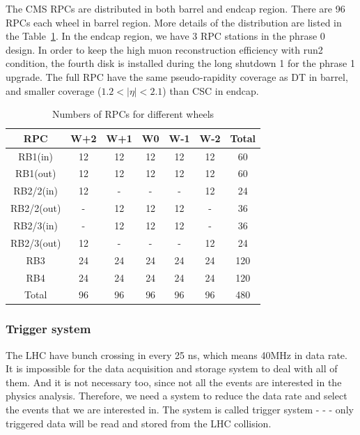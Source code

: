 The CMS RPCs are distributed in both barrel and endcap region. There are 96 RPCs each wheel in barrel region. More details of the distribution are listed in the Table~\ref{tab:c3cmsrpc}. In the endcap region, we have 3 RPC stations in the phrase 0 design. In order to keep the high muon reconstruction efficiency with run2 condition, the fourth disk is installed during the long shutdown 1 for the phrase 1 upgrade. The full RPC have the same pseudo-rapidity coverage as DT in barrel, and smaller coverage ($1.2<|\eta|<2.1$) than CSC in endcap.

\begin{table}[htbp]
\fontsize{10 pt}{1.2 em}
\selectfont
\begin{centering}
\caption{\label{tab:c3cmsrpc} Numbers of RPCs for different wheels}
\hspace*{-4ex}
\begin{tabular}{|c|c|c|c|c|c|c|}
\hline
 RPC &  W+2 & W+1 & W0 & W-1 & W-2 & Total \\
\hline
 RB1(in) & 12 & 12 & 12 & 12 & 12 & 60 \\
\hline
 RB1(out) & 12 & 12 & 12 & 12 & 12 & 60 \\
\hline
 RB2/2(in) & 12 & - & - & - & 12 & 24 \\
\hline
 RB2/2(out) & - & 12 & 12 & 12 & - & 36 \\
\hline
 RB2/3(in) & - & 12 & 12 & 12 & - & 36 \\
\hline
 RB2/3(out) & 12 & - & - & - & 12 & 24 \\
\hline
 RB3 & 24 & 24 & 24 & 24 & 24 & 120 \\
\hline
 RB4 & 24 & 24 & 24 & 24 & 24 & 120 \\
\hline
 Total & 96 & 96 & 96 & 96 & 96 & 480 \\
\hline
\end{tabular}
\par\end{centering}
\end{table}

\subsubsection{Trigger system}

The LHC have bunch crossing in every 25 ns, which means 40MHz in data rate. It is impossible for the data acquisition and storage system to deal with all of them. And it is not necessary too, since not all the events are interested in the physics analysis. Therefore, we need a system to reduce the data rate and select the events that we are interested in. The system is called trigger system - - - only triggered data will be read and stored from the LHC collision. 

